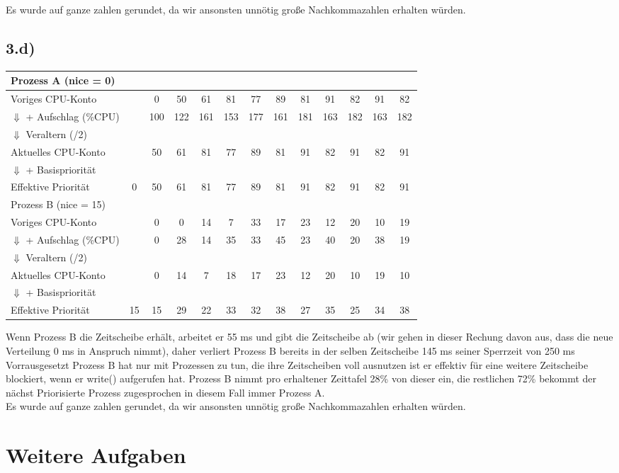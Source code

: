 \documentclass{ti2}
\begin{document}
Es wurde auf ganze zahlen gerundet, da wir ansonsten unnötig große Nachkommazahlen erhalten würden.

\subsection*{3.d)}

\begin{tabular}{l|c c c c c c c c c c c c}
	Prozess A (nice = 0)            & & & & & & & & & & & & \\
	\hline
	Voriges CPU-Konto                &   &   0&  50&  61&  81&  77&  89&  81&  91&  82&  91&  82\\
	$\Downarrow$ + Aufschlag (\%CPU) &   & 100& 122& 161& 153& 177& 161& 181& 163& 182& 163& 182\\
	$\Downarrow$ Veraltern (/2)      &&&&&&&&&&&&\\
	Aktuelles CPU-Konto              &   &  50&  61&  81&  77&  89&  81&  91&  82&  91&  82&  91\\
	$\Downarrow$ + Basispriorität    &&&&&&&&&&&&\\
	Effektive Priorität              &  0&  50&  61&  81&  77&  89&  81&  91&  82&  91&  82&  91\\
	\hline
	\hline
	Prozess B (nice = 15)            & & & & & & & & & & & & \\
	\hline
	Voriges CPU-Konto                &   &   0&   0&  14&   7&  33&  17&  23&  12&  20&  10&  19\\
	$\Downarrow$ + Aufschlag (\%CPU) &   &   0&  28&  14&  35&  33&  45&  23&  40&  20&  38&  19\\
	$\Downarrow$ Veraltern (/2)      &&&&&&&&&&&&\\
	Aktuelles CPU-Konto              &   &   0&  14&   7&  18&  17&  23&  12&  20&  10&  19&  10\\
	$\Downarrow$ + Basispriorität    &&&&&&&&&&&&\\
	Effektive Priorität              & 15&  15&  29&  22&  33&  32&  38&  27&  35&  25&  34&  38\\
\end{tabular}

Wenn Prozess B die Zeitscheibe erhält, arbeitet er 55 ms und gibt die Zeitscheibe ab (wir gehen in dieser Rechung davon aus, dass die neue Verteilung 0 ms in Anspruch nimmt), daher verliert Prozess B bereits in der selben Zeitscheibe 145 ms seiner Sperrzeit von 250 ms Vorrausgesetzt Prozess B hat nur mit Prozessen zu tun, die ihre Zeitscheiben voll ausnutzen ist er effektiv für eine weitere Zeitscheibe blockiert, wenn er write() aufgerufen hat. Prozess B nimmt pro erhaltener Zeittafel 28\% von dieser ein, die restlichen 72\% bekommt der nächst Priorisierte Prozess zugesprochen in diesem Fall immer Prozess A.\\

Es wurde auf ganze zahlen gerundet, da wir ansonsten unnötig große Nachkommazahlen erhalten würden.

\section*{Weitere Aufgaben}
\end{document}
